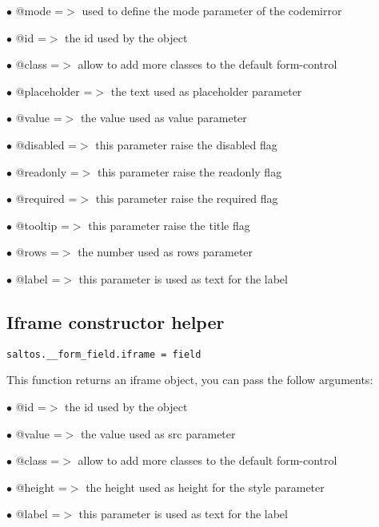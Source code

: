 \documentclass[a4paper]{book}
\begin{document}
\begin{compactitem}
\item[\color{myblue}$\bullet$] @mode        =$>$ used to define the mode parameter of the codemirror
\item[\color{myblue}$\bullet$] @id          =$>$ the id used by the object
\item[\color{myblue}$\bullet$] @class       =$>$ allow to add more classes to the default form-control
\item[\color{myblue}$\bullet$] @placeholder =$>$ the text used as placeholder parameter
\item[\color{myblue}$\bullet$] @value       =$>$ the value used as value parameter
\item[\color{myblue}$\bullet$] @disabled    =$>$ this parameter raise the disabled flag
\item[\color{myblue}$\bullet$] @readonly    =$>$ this parameter raise the readonly flag
\item[\color{myblue}$\bullet$] @required    =$>$ this parameter raise the required flag
\item[\color{myblue}$\bullet$] @tooltip     =$>$ this parameter raise the title flag
\item[\color{myblue}$\bullet$] @rows        =$>$ the number used as rows parameter
\item[\color{myblue}$\bullet$] @label       =$>$ this parameter is used as text for the label
\end{compactitem}

\hypertarget{toc385}{}
\subsection{Iframe constructor helper}

\begin{lstlisting}
saltos.__form_field.iframe = field
\end{lstlisting}

This function returns an iframe object, you can pass the follow arguments:

\begin{compactitem}
\item[\color{myblue}$\bullet$] @id     =$>$ the id used by the object
\item[\color{myblue}$\bullet$] @value  =$>$ the value used as src parameter
\item[\color{myblue}$\bullet$] @class  =$>$ allow to add more classes to the default form-control
\item[\color{myblue}$\bullet$] @height =$>$ the height used as height for the style parameter
\item[\color{myblue}$\bullet$] @label  =$>$ this parameter is used as text for the label
\end{compactitem}
\end{document}
